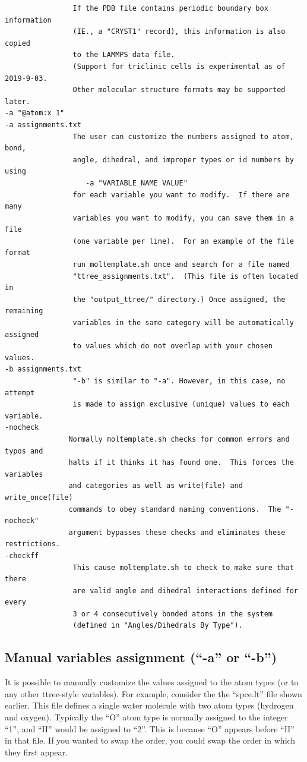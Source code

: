 \documentclass[11pt]{article}
\begin{document}
\begin{verbatim}
                If the PDB file contains periodic boundary box information 
                (IE., a "CRYST1" record), this information is also copied 
                to the LAMMPS data file.  
                (Support for triclinic cells is experimental as of 2019-9-03.
                Other molecular structure formats may be supported later.
-a "@atom:x 1"
-a assignments.txt
                The user can customize the numbers assigned to atom, bond,
                angle, dihedral, and improper types or id numbers by using
                   -a "VARIABLE_NAME VALUE"
                for each variable you want to modify.  If there are many
                variables you want to modify, you can save them in a file
                (one variable per line).  For an example of the file format
                run moltemplate.sh once and search for a file named
                "ttree_assignments.txt".  (This file is often located in
                the "output_ttree/" directory.) Once assigned, the remaining
                variables in the same category will be automatically assigned
                to values which do not overlap with your chosen values.
-b assignments.txt
                "-b" is similar to "-a". However, in this case, no attempt 
                is made to assign exclusive (unique) values to each variable.
-nocheck
               Normally moltemplate.sh checks for common errors and typos and
               halts if it thinks it has found one.  This forces the variables
               and categories as well as write(file) and write_once(file) 
               commands to obey standard naming conventions.  The "-nocheck"
               argument bypasses these checks and eliminates these restrictions.
-checkff
                This cause moltemplate.sh to check to make sure that there
                are valid angle and dihedral interactions defined for every
                3 or 4 consecutively bonded atoms in the system
                (defined in "Angles/Dihedrals By Type").
\end{verbatim}

\subsection{Manual variables assignment (``-a'' or ``-b'')}
\label{sec:manual_assignment}

It is possible to manually customize the values assigned 
to the atom types (or to any other ttree-style variables).
For example, consider the the ``spce.lt'' file shown earlier.
This file defines a single water molecule with two atom types
(hydrogen and oxygen).
Typically the ``O'' atom type is normally assigned to the integer ``1'',
and ``H'' would be assigned to ``2''.
This is because ``O'' appears before ``H'' in that file.
If you wanted to swap the order, you could swap the order
in which they first appear.
\end{document}
